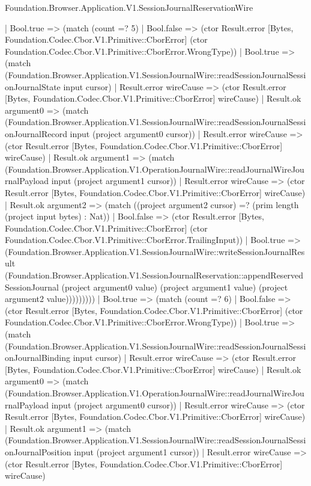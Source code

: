 \begin{lexlean}{Foundation.Browser.Application.V1.SessionJournalReservationWire}
\begin{semanticmodule}
{        | Bool.true => (match (count =? 5)
          | Bool.false => (ctor Result.error [Bytes, Foundation.Codec.Cbor.V1.Primitive::CborError] (ctor Foundation.Codec.Cbor.V1.Primitive::CborError.WrongType))
          | Bool.true => (match (Foundation.Browser.Application.V1.SessionJournalWire::readSessionJournalSessionJournalState input cursor)
            | Result.error wireCause => (ctor Result.error [Bytes, Foundation.Codec.Cbor.V1.Primitive::CborError] wireCause)
            | Result.ok argument0 => (match (Foundation.Browser.Application.V1.SessionJournalWire::readSessionJournalSessionJournalRecord input (project argument0 cursor))
              | Result.error wireCause => (ctor Result.error [Bytes, Foundation.Codec.Cbor.V1.Primitive::CborError] wireCause)
              | Result.ok argument1 => (match (Foundation.Browser.Application.V1.OperationJournalWire::readJournalWireJournalPayload input (project argument1 cursor))
                | Result.error wireCause => (ctor Result.error [Bytes, Foundation.Codec.Cbor.V1.Primitive::CborError] wireCause)
                | Result.ok argument2 => (match ((project argument2 cursor) =? (prim length (project input bytes) : Nat))
                  | Bool.false => (ctor Result.error [Bytes, Foundation.Codec.Cbor.V1.Primitive::CborError] (ctor Foundation.Codec.Cbor.V1.Primitive::CborError.TrailingInput))
                  | Bool.true => (Foundation.Browser.Application.V1.SessionJournalWire::writeSessionJournalResult (Foundation.Browser.Application.V1.SessionJournalReservation::appendReservedSessionJournal (project argument0 value) (project argument1 value) (project argument2 value)))))))))
      | Bool.true => (match (count =? 6)
        | Bool.false => (ctor Result.error [Bytes, Foundation.Codec.Cbor.V1.Primitive::CborError] (ctor Foundation.Codec.Cbor.V1.Primitive::CborError.WrongType))
        | Bool.true => (match (Foundation.Browser.Application.V1.SessionJournalWire::readSessionJournalSessionJournalBinding input cursor)
          | Result.error wireCause => (ctor Result.error [Bytes, Foundation.Codec.Cbor.V1.Primitive::CborError] wireCause)
          | Result.ok argument0 => (match (Foundation.Browser.Application.V1.OperationJournalWire::readJournalWireJournalPayload input (project argument0 cursor))
            | Result.error wireCause => (ctor Result.error [Bytes, Foundation.Codec.Cbor.V1.Primitive::CborError] wireCause)
            | Result.ok argument1 => (match (Foundation.Browser.Application.V1.SessionJournalWire::readSessionJournalSessionJournalPosition input (project argument1 cursor))
              | Result.error wireCause => (ctor Result.error [Bytes, Foundation.Codec.Cbor.V1.Primitive::CborError] wireCause)
}
\end{semanticmodule}
\end{lexlean}
